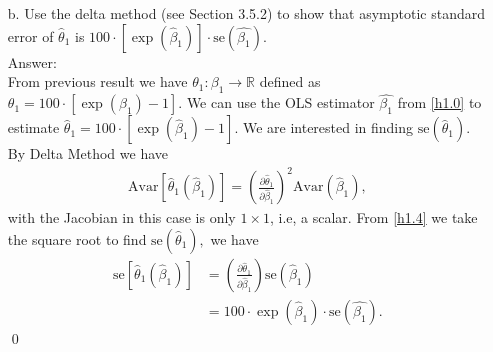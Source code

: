 \documentclass[10pt]{article}
\newcommand{\Av}{\text{Avar}}
\newcommand{\se}{\text{se}}
\begin{document}
\begin{enumerate}
\item[b.] Use the delta method (see Section 3.5.2) to show that asymptotic standard error of $\hat{\theta}_1$ is $100\cdot[\exp(\hat{\beta}_1)]\cdot \se(\hat{\beta_1})$.
\\ Answer:\\
From previous result we have $\theta_1:\beta_1\to\mathbb{R}$ defined as $\theta_1=100\cdot[\exp{(\beta_1)}-1].$ We can use the OLS estimator $\hat{\beta_1}$ from \eqref{h1.0} to estimate $\hat{\theta}_1=100\cdot[\exp(\hat{\beta}_1)-1]$. We are interested in finding $\se(\hat{\theta}_1).$ By Delta Method we have
\begin{align}
    \Av[\hat{\theta}_1(\hat{\beta}_1)]=\left(\frac{\partial\hat{\theta}_1}{\partial \hat{\beta}_1} \right)^2 \Av(\hat{\beta}_1), \label{h1.4}
\end{align}
with the Jacobian in this case is only $1\times 1$, i.e, a scalar. From \eqref{h1.4} we take the square root to find $\se(\hat{\theta}_1),$ we have
\begin{align*}
    \se[\hat{\theta}_1(\hat{\beta}_1)]&=\left(\frac{\partial\hat{\theta}_1}{\partial \hat{\beta}_1} \right) \se(\hat{\beta}_1) \\
    &=100\cdot\exp(\hat{\beta}_1)\cdot \se(\hat{\beta_1}).
\end{align*}\qed


\end{enumerate}
\end{document}
